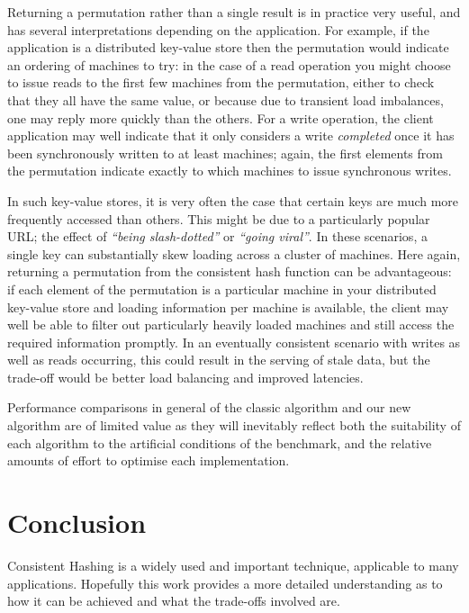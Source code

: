 \documentclass[runningheads,a4paper]{llncs}
\begin{document}
Returning a permutation rather than a single result is in practice
very useful, and has several interpretations depending on the
application. For example, if the application is a distributed
key-value store then the permutation would indicate an ordering of
machines to try: in the case of a read operation you might choose to
issue reads to the first few machines from the permutation, either to
check that they all have the same value, or because due to transient
load imbalances, one may reply more quickly than the others. For a
write operation, the client application may well indicate that it only
considers a write {\em completed} once it has been synchronously
written to at least  machines; again, the first  elements from
the permutation indicate exactly to which machines to issue
synchronous writes.

In such key-value stores, it is very often the case that certain keys
are much more frequently accessed than others. This might be due to a
particularly popular URL; the effect of {\em ``being slash-dotted''}
or {\em ``going viral''}. In these scenarios, a single key can
substantially skew loading across a cluster of machines. Here again,
returning a permutation from the consistent hash function can be
advantageous: if each element of the permutation is a particular
machine in your distributed key-value store and loading information
per machine is available, the client may well be able to filter out
particularly heavily loaded machines and still access the required
information promptly. In an eventually consistent scenario with writes
as well as reads occurring, this could result in the serving of stale
data, but the trade-off would be better load balancing and improved
latencies.

Performance comparisons in general of the classic algorithm and our
new algorithm are of limited value as they will inevitably reflect
both the suitability of each algorithm to the artificial conditions of
the benchmark, and the relative amounts of effort to optimise each
implementation.

\section{Conclusion}

Consistent Hashing is a widely used and important technique,
applicable to many applications. Hopefully this work provides a more
detailed understanding as to how it can be achieved and what the
trade-offs involved are.
\end{document}
